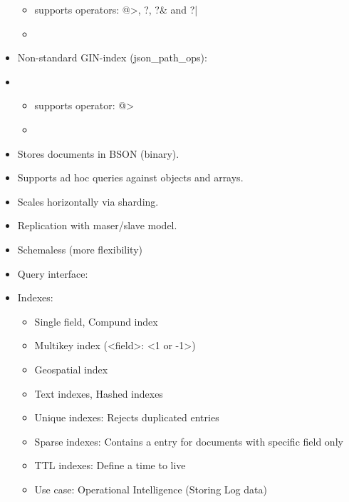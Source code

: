 \begin{breakbox}
\begin{itemize}
		\begin{itemize}
			\item supports operators: @>, ?, ?\& and ?|
			\item[]
		\end{itemize}
	\item Non-standard GIN-index (json\_path\_ops):
\end{itemize}

\begin{itemize}
	\item[]
		\begin{itemize}
			\item supports operator: @>
			\item[]
		\end{itemize}
\end{itemize}
\end{breakbox}

\begin{breakbox}
\begin{itemize}
	\item Stores documents in BSON (binary).
	\item Supports ad hoc queries against objects and arrays.
	\item Scales horizontally via sharding.
	\item Replication with maser/slave model.
	\item Schemaless (more flexibility)
	\item Query interface:
\end{itemize}

\begin{itemize}
	\item Indexes:
		\begin{itemize}
			\item Single field, Compund index
			\item Multikey index (<field>: <1 or -1>)
			\item Geospatial index
			\item Text indexes, Hashed indexes
			\item Unique indexes: Rejects duplicated entries
			\item Sparse indexes: Contains a entry for documents with specific field only
			\item TTL indexes: Define a time to live
			\item Use case: Operational Intelligence (Storing Log data)
		\end{itemize}
\end{itemize}
\end{breakbox}

